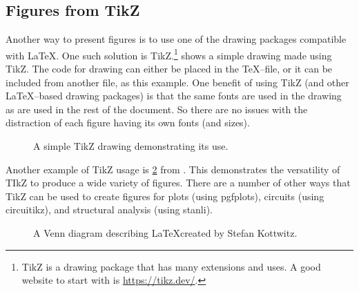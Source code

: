 \subsection{Figures from TikZ} \label{sec:FiguresFromTikZ}
    Another way to present figures is to use one of the drawing packages compatible with \LaTeX.
    One such solution is TikZ.\footnote{TikZ is a drawing package that has many extensions and uses. A good website to start with is \url{https://tikz.dev/}.}
     shows a simple drawing made using TikZ.
    The code for drawing can either be placed in the \TeX--file, or it can be included from another file, as this example.
    One benefit of using TikZ (and other \LaTeX--based drawing packages) is that the same fonts are used in the drawing as are used in the rest of the document.
    So there are no issues with the distraction of each figure having its own fonts (and sizes).
    \begin{figure}
        \centering
        
        \caption{A simple TikZ drawing demonstrating its use.}
        \label{fig:tikz_drawing}
    \end{figure}

    Another example of TikZ usage is \cref{fig:tikz_venn} from \cite{kottwitz2015}.
    This demonstrates the versatility of TIkZ to produce a wide variety of figures.
    There are a number of other ways that TikZ can be used to create figures for plots (using pgfplots), circuits (using circuitikz), and structural analysis (using stanli).
    \begin{figure}
        \centering
        
        \caption{A Venn diagram describing \LaTeX created by Stefan Kottwitz\cite{kottwitz2015}.}
        \label{fig:tikz_venn}
    \end{figure}

